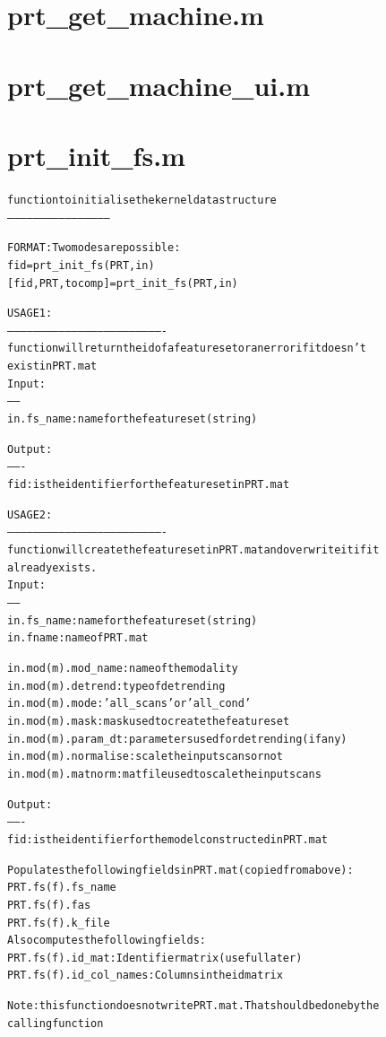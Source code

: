 \section{prt\_get\_machine.m}
\begin{alltt}

\end{alltt}


\section{prt\_get\_machine\_ui.m}
\begin{alltt}

\end{alltt}


\section{prt\_init\_fs.m}
\begin{alltt}

 function to initialise the kernel data structure
 ------------------------------------------------
 
 FORMAT: Two modes are possible:
     fid = prt\_init\_fs(PRT, in)
     [fid, PRT, tocomp] = prt\_init\_fs(PRT, in)
 
 USAGE 1:
 -------------------------------------------------------------------------
 function will return the id of a feature set or an error if it doesn't
 exist in PRT.mat
 Input:
 ------
 in.fs\_name: name for the feature set (string)
 
 Output:
 -------
 fid : is the identifier for the feature set in PRT.mat
 
 USAGE 2:
 -------------------------------------------------------------------------
 function will create the feature set in PRT.mat and overwrite it if it
 already exists.
 Input:
 ------
 in.fs\_name: name for the feature set (string)
 in.fname:   name of PRT.mat
 
 in.mod(m).mod\_name:  name of the modality
 in.mod(m).detrend:   type of detrending
 in.mod(m).mode:      'all\_scans' or 'all\_cond'
 in.mod(m).mask:	   mask used to create the feature set
 in.mod(m).param\_dt:  parameters used for detrending (if any)
 in.mod(m).normalise: scale the input scans or not
 in.mod(m).matnorm:   mat file used to scale the input scans
 
 Output:
 -------
 fid : is the identifier for the model constructed in PRT.mat
 
 Populates the following fields in PRT.mat (copied from above):
   PRT.fs(f).fs\_name
   PRT.fs(f).fas
   PRT.fs(f).k\_file
 Also computes the following fields:
   PRT.fs(f).id\_mat:       Identifier matrix (useful later)
   PRT.fs(f).id\_col\_names: Columns in the id matrix
 
 Note: this function does not write PRT.mat. That should be done by the
       calling function
\end{alltt}


